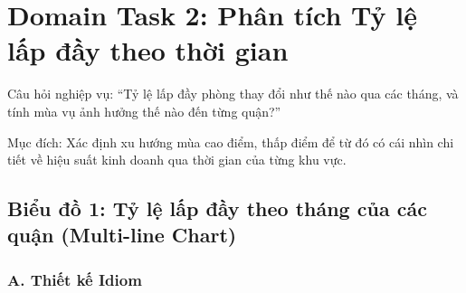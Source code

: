 \section{Domain Task 2: Phân tích Tỷ lệ lấp đầy theo thời gian}

Câu hỏi nghiệp vụ: ``Tỷ lệ lấp đầy phòng thay đổi như thế nào qua các
tháng, và tính mùa vụ ảnh hưởng thế nào đến từng quận?''

Mục đích: Xác định xu hướng mùa cao điểm, thấp điểm để từ đó có cái nhìn
chi tiết về hiệu suất kinh doanh qua thời gian của từng khu vực.

\subsection{Biểu đồ 1: Tỷ lệ lấp đầy theo tháng của các quận (Multi-line Chart)}

\subsubsection*{A. Thiết kế Idiom}


